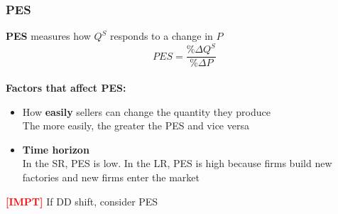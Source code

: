 \documentclass{article}
\newcommand{\impt}[0]{\textcolor{red}{\textbf{[IMPT] }}}
\begin{document}
\begin{multicols}{2}
\subsubsection{PES}
\textbf{PES} measures how $Q^S$ responds to a change in $P$
$$PES = \frac{\%\Delta Q^S}{\%\Delta P}$$\\
\textbf{Factors that affect PES:}
\begin{itemize}
	\item How \textbf{easily} sellers can change the quantity they produce\\
	The more easily, the greater the PES and vice versa
	\item \textbf{Time horizon}\\
	In the SR, PES is low. In the LR, PES is high because firms build new factories and new firms enter the market
\end{itemize}
\impt If DD shift, consider PES


\end{multicols}
\end{document}
